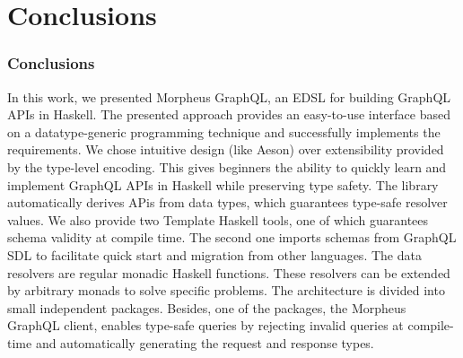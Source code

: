 \section{Conclusions}

\begin{frame}

\frametitle{Conclusions}

In this work, we presented Morpheus GraphQL, an EDSL for building GraphQL APIs in Haskell. The presented approach provides an easy-to-use interface based on a datatype-generic programming technique and successfully implements the requirements. We chose intuitive design (like Aeson) over extensibility provided by the type-level encoding. 
This gives beginners the ability to quickly learn and implement GraphQL APIs in Haskell while preserving type safety.
The library automatically derives APis from data types, which guarantees type-safe resolver values. We also provide two Template Haskell tools, one of which guarantees schema validity at compile time. The second one imports schemas from GraphQL SDL to facilitate quick start and migration from other languages.
The data resolvers are regular monadic Haskell functions. These resolvers can be extended by arbitrary monads to solve specific problems.  The architecture is divided into small independent packages. Besides, one of the packages, the Morpheus GraphQL client, enables type-safe queries by rejecting invalid queries at compile-time and automatically generating the request and response types.
\end{frame}
